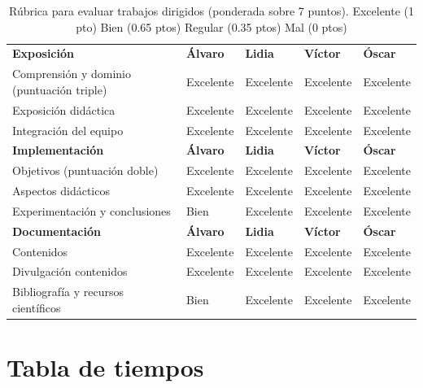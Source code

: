 \documentclass[a4paper]{article}
\begin{document}
\begin{table}[htbp]
  \centering
  \scriptsize
  \renewcommand{\arraystretch}{1.5}
  \setlength{\tabcolsep}{4pt}
  \begin{tabular}{|>{\raggedright\arraybackslash}p{2.8cm}|>{\raggedright\arraybackslash}p{3cm}|>{\raggedright\arraybackslash}p{3cm}|>{\raggedright\arraybackslash}p{3cm}|>{\raggedright\arraybackslash}p{3cm}|}
  \hline
  \multicolumn{5}{|c|}{\textbf{Rúbrica para evaluar los trabajos dirigidos}} \\
  \hline
  \textbf{Exposición} &  \textbf{Álvaro} & \textbf{Lidia} & \textbf{Víctor} & \textbf{Óscar} \\
  \hline
  Comprensión y dominio (puntuación triple)& Excelente & Excelente & Excelente & Excelente \\
  \hline
  Exposición didáctica & Excelente & Excelente & Excelente & Excelente\\
  \hline
  Integración del equipo & Excelente & Excelente & Excelente & Excelente \\
  \hline
  \textbf{Implementación} & \textbf{Álvaro} & \textbf{Lidia} & \textbf{Víctor} & \textbf{Óscar} \\
  \hline
  Objetivos (puntuación doble)& Excelente & Excelente & Excelente & Excelente \\
  \hline
  Aspectos didácticos & Excelente & Excelente & Excelente & Excelente \\
  \hline
  Experimentación y conclusiones & Bien & Excelente & Excelente & Excelente \\
  \hline
  \textbf{Documentación} & \textbf{Álvaro} & \textbf{Lidia} & \textbf{Víctor} & \textbf{Óscar} \\
  \hline
  Contenidos & Excelente & Excelente & Excelente & Excelente \\
  \hline
  Divulgación contenidos & Excelente & Excelente & Excelente & Excelente \\
  \hline
  Bibliografía y recursos científicos & Bien & Excelente & Excelente & Excelente \\
  \hline
  \end{tabular}
  \caption{Rúbrica para evaluar trabajos dirigidos (ponderada sobre 7 puntos). Excelente (1 pto) Bien (0.65 ptos) Regular (0.35 ptos)  Mal (0 ptos)
  }
  \end{table}

  \newpage

\section{Tabla de tiempos}
\end{document}
